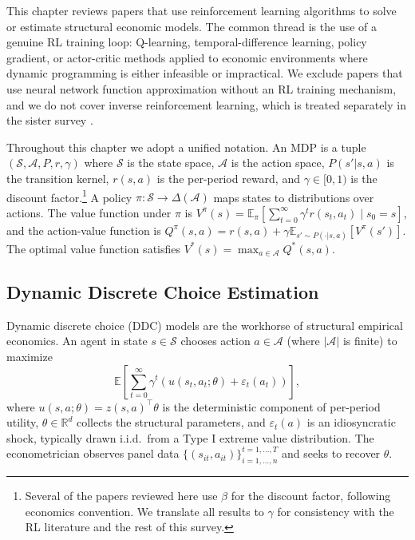 This chapter reviews papers that use reinforcement learning algorithms to solve or estimate structural economic models. The common thread is the use of a genuine RL training loop: Q-learning, temporal-difference learning, policy gradient, or actor-critic methods applied to economic environments where dynamic programming is either infeasible or impractical. We exclude papers that use neural network function approximation without an RL training mechanism, and we do not cover inverse reinforcement learning, which is treated separately in the sister survey \citep{RustRawat2026}.

Throughout this chapter we adopt a unified notation. An MDP is a tuple $(\mathcal{S}, \mathcal{A}, P, r, \gamma)$ where $\mathcal{S}$ is the state space, $\mathcal{A}$ is the action space, $P(s' | s, a)$ is the transition kernel, $r(s,a)$ is the per-period reward, and $\gamma \in [0,1)$ is the discount factor.\footnote{Several of the papers reviewed here use $\beta$ for the discount factor, following economics convention. We translate all results to $\gamma$ for consistency with the RL literature and the rest of this survey.} A policy $\pi: \mathcal{S} \to \Delta(\mathcal{A})$ maps states to distributions over actions. The value function under $\pi$ is $V^\pi(s) = \mathbb{E}_\pi\left[\sum_{t=0}^\infty \gamma^t r(s_t, a_t) \mid s_0 = s\right]$, and the action-value function is $Q^\pi(s,a) = r(s,a) + \gamma \mathbb{E}_{s' \sim P(\cdot|s,a)}[V^\pi(s')]$. The optimal value function satisfies $V^*(s) = \max_{a \in \mathcal{A}} Q^*(s,a)$.


\subsection{Dynamic Discrete Choice Estimation}

Dynamic discrete choice (DDC) models are the workhorse of structural empirical economics. An agent in state $s \in \mathcal{S}$ chooses action $a \in \mathcal{A}$ (where $|\mathcal{A}|$ is finite) to maximize
\begin{equation}
\mathbb{E}\left[\sum_{t=0}^\infty \gamma^t \left(u(s_t, a_t; \theta) + \varepsilon_t(a_t)\right)\right],
\end{equation}
where $u(s,a;\theta) = z(s,a)^\top \theta$ is the deterministic component of per-period utility, $\theta \in \mathbb{R}^d$ collects the structural parameters, and $\varepsilon_t(a)$ is an idiosyncratic shock, typically drawn i.i.d.\ from a Type I extreme value distribution. The econometrician observes panel data $\{(s_{it}, a_{it})\}_{i=1,\ldots,n}^{t=1,\ldots,T}$ and seeks to recover $\theta$.


